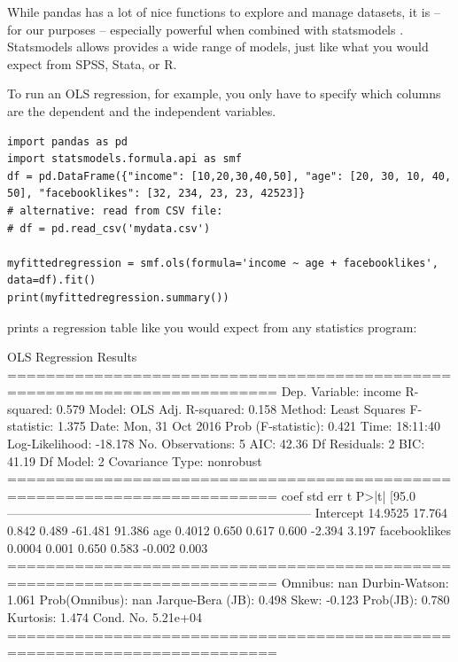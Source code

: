 \documentclass[a4paper,12pt]{book}
\begin{document}
While pandas has a lot of nice functions to explore and manage datasets, it is -- for our purposes -- especially powerful when combined with statsmodels \citep{statsmodels}. Statsmodels allows provides a wide range of models, just like what you would expect from SPSS, Stata, or R.

To run an OLS regression, for example, you only have to specify which columns are the dependent and the independent variables. 

\begin{lstlisting}
import pandas as pd
import statsmodels.formula.api as smf
df = pd.DataFrame({"income": [10,20,30,40,50], "age": [20, 30, 10, 40, 50], "facebooklikes": [32, 234, 23, 23, 42523]}
# alternative: read from CSV file:
# df = pd.read_csv('mydata.csv')

myfittedregression = smf.ols(formula='income ~ age + facebooklikes', data=df).fit()
print(myfittedregression.summary())

\end{lstlisting}
prints a regression table like you would expect from any statistics program:

\begin{lstlistingoutput}
OLS Regression Results                            
==========================================================================
Dep. Variable:                 income   R-squared:                       0.579
Model:                            OLS   Adj. R-squared:                  0.158
Method:                 Least Squares   F-statistic:                     1.375
Date:                Mon, 31 Oct 2016   Prob (F-statistic):              0.421
Time:                        18:11:40   Log-Likelihood:                -18.178
No. Observations:                   5   AIC:                             42.36
Df Residuals:                       2   BIC:                             41.19
Df Model:                           2                                         
Covariance Type:            nonrobust                                         
==========================================================================
coef    std err          t      P>|t|      [95.0%
--------------------------------------------------------------------------
Intercept        14.9525     17.764      0.842      0.489       -61.481    91.386
age               0.4012      0.650      0.617      0.600        -2.394     3.197
facebooklikes     0.0004      0.001      0.650      0.583        -0.002     0.003
==========================================================================
Omnibus:                          nan   Durbin-Watson:                   1.061
Prob(Omnibus):                    nan   Jarque-Bera (JB):                0.498
Skew:                          -0.123   Prob(JB):                        0.780
Kurtosis:                       1.474   Cond. No.                     5.21e+04
==========================================================================
\end{lstlistingoutput}
\end{document}
